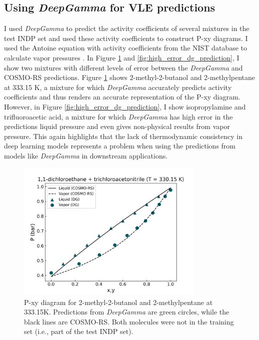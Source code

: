 \subsection{Using \textit{DeepGamma} for VLE predictions}

I used \textit{DeepGamma} to predict the activity coefficients of several mixtures in the test INDP set and used these activity coefficients to construct P-xy diagrams. I used the Antoine equation with activity coefficients from the NIST database to calculate vapor pressures \cite{Muzny}. In Figure \ref{fig:low_error_dg_prediction} and \ref{fig:high_error_dg_prediction}, I show two mixtures with different levels of error  between the \textit{DeepGamma} and COSMO-RS predictions. Figure \ref{fig:low_error_dg_prediction} shows 2-methyl-2-butanol and 2-methylpentane at 333.15 K, a mixture for which \textit{DeepGamma} accurately predicts activity coefficients and thus renders an accurate representation of the P-xy diagram.  However, in Figure \ref{fig:high_error_dg_prediction}, I show isopropylamine and trifluoroacetic acid, a mixture for which \textit{DeepGamma} has high error in the predictions liquid pressure and even gives non-physical results from vapor pressure. This again highlights that the lack of thermodynamic consistency in deep learning models represents a problem when using the predictions from models like \textit{DeepGamma} in downstream applications.

\begin{figure}
    \centering
    \includegraphics[trim=0 0 0 40, clip, width=0.8\textwidth]{gfx/Chapter07/low_error_pxy.png}
    \caption{P-xy diagram for 2-methyl-2-butanol and 2-methylpentane at 333.15K. Predictions from \textit{DeepGamma} are green circles, while the black lines are COSMO-RS. Both molecules were not in the training set (i.e., part of the test INDP set).}
    \label{fig:low_error_dg_prediction}
\end{figure}

